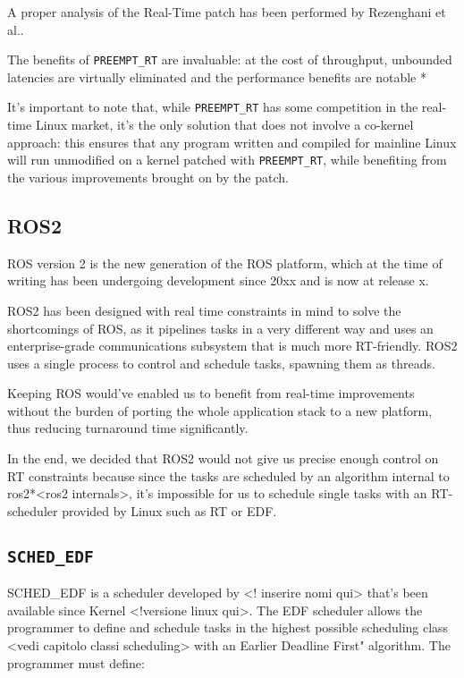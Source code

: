 \documentclass[a4paper,12pt]{report}
\begin{document}
A proper analysis of the Real-Time patch has been performed by Rezenghani et al.\cite{survey-preempt-rt}.

The benefits of \texttt{PREEMPT\_RT}  are invaluable: at the cost of throughput, unbounded latencies are virtually eliminated and the performance benefits are notable *%

It's important to note that, while \texttt{PREEMPT\_RT} has some competition in the real-time Linux market, it's the only solution that does not involve a co-kernel approach: this ensures that any program written and compiled for mainline Linux will run unmodified on a kernel patched with \texttt{PREEMPT\_RT}, while benefiting from the various improvements brought on by the patch. 

\subsection{ROS2}

ROS version 2 is the new generation of the ROS platform, which at the time of writing has been undergoing development since 20xx and is now at release x.

ROS2 has been designed with real time constraints in mind to solve the shortcomings of ROS, as it pipelines tasks in a very different way and uses an enterprise-grade communications subsystem that is much more RT-friendly. ROS2 uses a single process to control and schedule tasks, spawning them as threads.

Keeping ROS would've enabled us to benefit from real-time improvements without the burden of porting the whole application stack to a new platform, thus reducing turnaround time significantly. 

In the end, we decided that ROS2 would not give us precise enough control on RT constraints because since the tasks are scheduled by an algorithm internal to ros2*<ros2 internals>, it's impossible for us to schedule single tasks with an RT-scheduler provided by Linux such as RT or EDF. 

\subsection{\texttt{SCHED\_EDF}}

SCHED\_EDF is a scheduler developed by <! inserire nomi qui> that's been available since Kernel <!versione linux qui>. The EDF scheduler allows the programmer to define and schedule tasks in the highest possible scheduling class <vedi capitolo classi scheduling> with an Earlier Deadline First" algorithm. The programmer must define:
\end{document}
